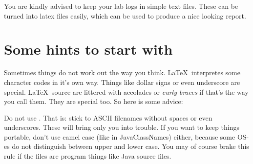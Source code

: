 
You are kindly advised to keep your lab logs in simple text
files. These can be turned into latex files easily,
which can be used to produce a nice looking report.
\clearpage 
\section{Some hints to start with}
Sometimes things do not work out the way you think.
\LaTeX\ interpretes some character codes in it's own way.
Things like dollar signs or even underscore are special.
\LaTeX\ source are littered with accolades or \textit{curly braces} if that's
the way you call them. They are special too. So here is some advice: 

Do not use . That is: stick to ASCII filenames without spaces or even underscores. 
These will bring only you into trouble. If you want to keep things portable, 
don't use camel case (like in JavaClassNames) either, because
some OS-es do not distinguish between upper and lower case. You may of
course brake this rule if the files are program things like
Java source files.


